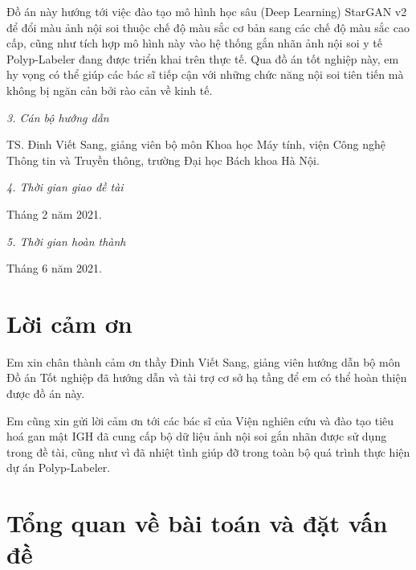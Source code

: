 \documentclass[12pt]{extreport}
\begin{document}
Đồ án này hướng tới việc đào tạo mô hình học sâu (Deep Learning) StarGAN v2 để đổi màu ảnh nội soi thuộc chế độ màu sắc cơ bản sang các chế độ màu sắc cao cấp, cũng như tích hợp mô hình này vào hệ thống gắn nhãn ảnh nội soi y tế Polyp-Labeler đang được triển khai trên thực tế. Qua đồ án tốt nghiệp này, em hy vọng có thể giúp các bác sĩ tiếp cận với những chức năng nội soi tiên tiến mà không bị ngăn cản bởi rào cản về kinh tế.

\textit{3. Cán bộ hướng dẫn}

TS. Đinh Viết Sang, giảng viên bộ môn Khoa học Máy tính, viện Công nghệ Thông tin và Truyền thông, trường Đại học Bách khoa Hà Nội.

\textit{4. Thời gian giao đề tài}

Tháng 2 năm 2021.

\textit{5. Thời gian hoàn thành}

Tháng 6 năm 2021.

\vspace{1cm}
\begin{center}
    \fontsize{10pt}{1}
\end{center}

\chapter*{Lời cảm ơn}

Em xin chân thành cảm ơn thầy Đinh Viết Sang, giảng viên hướng dẫn bộ môn Đồ án Tốt nghiệp đã hướng dẫn và tài trợ cơ sở hạ tầng để em có thể hoàn thiện được đồ án này.

Em cũng xin gửi lời cảm ơn tới các bác sĩ của Viện nghiên cứu và đào tạo tiêu hoá gan mật IGH đã cung cấp bộ dữ liệu ảnh nội soi gắn nhãn được sử dụng trong đề tài, cũng như vì đã nhiệt tình giúp đỡ trong toàn bộ quá trình thực hiện dự án Polyp-Labeler.

\tableofcontents

\chapter{Tổng quan về bài toán và đặt vấn đề}
\end{document}
